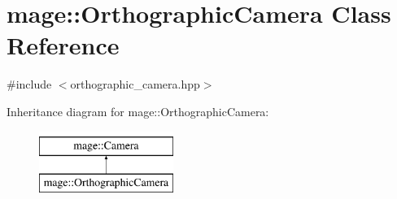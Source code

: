 \hypertarget{classmage_1_1_orthographic_camera}{}\section{mage\+:\+:Orthographic\+Camera Class Reference}
\label{classmage_1_1_orthographic_camera}


{\ttfamily \#include $<$orthographic\+\_\+camera.\+hpp$>$}

Inheritance diagram for mage\+:\+:Orthographic\+Camera\+:\begin{figure}[H]
\begin{center}
\leavevmode
\includegraphics[height=2.000000cm]{classmage_1_1_orthographic_camera}
\end{center}
\end{figure}
